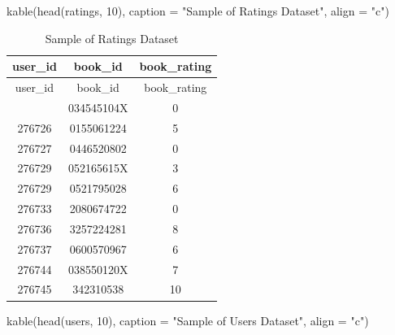 \documentclass[
  12pt]{article}
\newenvironment{Shaded}{\begin{snugshade}}{\end{snugshade}}
\newcommand{\AttributeTok}[1]{\textcolor[rgb]{0.40,0.45,0.13}{#1}}
\newcommand{\DecValTok}[1]{\textcolor[rgb]{0.68,0.00,0.00}{#1}}
\newcommand{\FunctionTok}[1]{\textcolor[rgb]{0.28,0.35,0.67}{#1}}
\newcommand{\NormalTok}[1]{\textcolor[rgb]{0.00,0.23,0.31}{#1}}
\newcommand{\StringTok}[1]{\textcolor[rgb]{0.13,0.47,0.30}{#1}}
\begin{document}
\begin{Shaded}
\begin{Highlighting}[]
\FunctionTok{kable}\NormalTok{(}\FunctionTok{head}\NormalTok{(ratings, }\DecValTok{10}\NormalTok{), }\AttributeTok{caption =} \StringTok{"Sample of Ratings Dataset"}\NormalTok{, }\AttributeTok{align =} \StringTok{"c"}\NormalTok{)}
\end{Highlighting}
\end{Shaded}

\begin{longtable}[]{@{}ccc@{}}
\caption{Sample of Ratings Dataset}\tabularnewline
\toprule\noalign{}
user\_id & book\_id & book\_rating \\
\midrule\noalign{}
\endfirsthead
\toprule\noalign{}
user\_id & book\_id & book\_rating \\
\midrule\noalign{}
\endhead
\bottomrule\noalign{}
\endlastfoot
276725 & 034545104X & 0 \\
276726 & 0155061224 & 5 \\
276727 & 0446520802 & 0 \\
276729 & 052165615X & 3 \\
276729 & 0521795028 & 6 \\
276733 & 2080674722 & 0 \\
276736 & 3257224281 & 8 \\
276737 & 0600570967 & 6 \\
276744 & 038550120X & 7 \\
276745 & 342310538 & 10 \\
\end{longtable}

\begin{Shaded}
\begin{Highlighting}[]
\FunctionTok{kable}\NormalTok{(}\FunctionTok{head}\NormalTok{(users, }\DecValTok{10}\NormalTok{), }\AttributeTok{caption =} \StringTok{"Sample of Users Dataset"}\NormalTok{, }\AttributeTok{align =} \StringTok{"c"}\NormalTok{)}
\end{Highlighting}
\end{Shaded}
\end{document}
